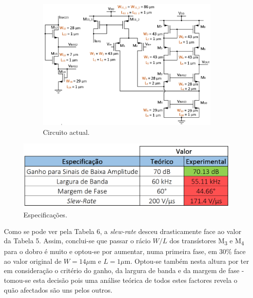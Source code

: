 \documentclass[11pt]{article}
\numberwithin{equation}{section}
\begin{document}
\begin{figure}[H]
	\centering
	\begin{minipage}[c]{0.58\textwidth}
		\begin{figure}[H]
			\includegraphics[keepaspectratio=true, scale=0.34]{teoricas/ajuste2}
			\caption{Circuito actual.}
			\vspace{-0.8em}
		\end{figure}
	\end{minipage}
	\begin{minipage}[c]{0.24\textwidth}
		\centering
		\begin{table}[H]
			\centering
			\caption{Especificações.}
			\vspace{-1.5mm}
			\includegraphics[keepaspectratio=true, scale=0.33]{teoricas/tabajuste2}
		\end{table}
	\end{minipage}	
\end{figure}

Como se pode ver pela Tabela 6, a \textit{slew-rate} desceu drasticamente face ao valor da Tabela 5. Assim, conclui-se que passar o rácio $W/L$ dos transístores M\textsubscript{3} e M\textsubscript{4} para o dobro é muito e optou-se por aumentar, numa primeira fase, em 30\% face ao valor original de $W = 14\mu$m e $L = 1\mu$m. Optou-se também nesta altura por ter em consideração o critério do ganho, da largura de banda e da margem de fase - tomou-se esta decisão pois uma análise teórica de todos estes factores revela o quão afectados são uns pelos outros.
\end{document}
